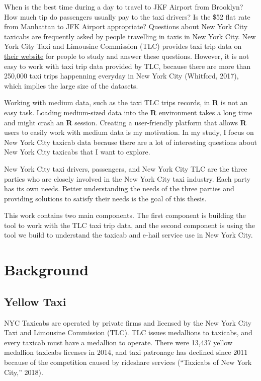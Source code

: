 \documentclass[12pt,twoside]{reedthesis}
\theoremstyle{definition}
\theoremstyle{definition}
\theoremstyle{definition}
\theoremstyle{remark}
\begin{document}
When is the best time during a day to travel to JKF Airport from
Brooklyn? How much tip do passengers usually pay to the taxi drivers? Is
the \$52 flat rate from Manhattan to JFK Airport appropriate? Questions
about New York City taxicabs are frequently asked by people travelling
in taxis in New York City. New York City Taxi and Limousine Commission
(TLC) provides taxi trip data on
\href{http://www.nyc.gov/html/tlc/html/about/trip_record_data.shtml}{their
website} for people to study and answer these questions. However, it is
not easy to work with taxi trip data provided by TLC, because there are
more than 250,000 taxi trips happenning everyday in New York City
(Whitford, 2017), which implies the large size of the datasets.

Working with medium data, such as the taxi TLC trips records, in
\textbf{R} is not an easy task. Loading medium-sized data into the
\textbf{R} environment takes a long time and might crash an \textbf{R}
session. Creating a user-friendly platform that allows \textbf{R} users
to easily work with medium data is my motivation. In my study, I focus
on New York City taxicab data because there are a lot of interesting
questions about New York City taxicabs that I want to explore.

New York City taxi drivers, passengers, and New York City TLC are the
three parties who are closely involved in the New York City taxi
industry. Each party has its own needs. Better understanding the needs
of the three parties and providing solutions to satisfy their needs is
the goal of this thesis.

This work contains two main components. The first component is building
the tool to work with the TLC taxi trip data, and the second component
is using the tool we build to understand the taxicab and e-hail service
use in New York City.

\section{Background}\label{background}

\subsection{Yellow Taxi}\label{yellow-taxi}

NYC Taxicabs are operated by private firms and licensed by the New York
City Taxi and Limousine Commission (TLC). TLC issues medallions to
taxicabs, and every taxicab must have a medallion to operate. There were
13,437 yellow medallion taxicabs licenses in 2014, and taxi patronage
has declined since 2011 because of the competition caused by rideshare
services (``Taxicabs of New York City,'' 2018).
\end{document}
